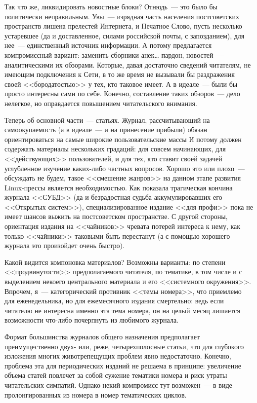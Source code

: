 Так что же, ликвидировать новостные блоки? Отнюдь~--- это было бы политически неправильным. Увы~--- изрядная часть населения постсоветских пространств лишена прелестей Интернета, и Печатное Слово, пусть несколько устаревшее (да и доставленное, силами российской почты, с запозданием), для нее~--- единственный источник информации. А потому предлагается компромиссный вариант: заменить сборники анек… пардон, новостей~--- аналитическими их обзорами. Которые, давая достаточно сведений читателям, не имеющим подключения к Сети, в то же время не вызывали бы раздражения своей <<бородатостью>> у тех, кто таковое имеет. А в идеале~--- были бы просто интересны сами по себе. Конечно, составление таких обзоров~--- дело нелегкое, но оправдается повышением читательского внимания.

Теперь об основной части~--- статьях. Журнал, рассчитывающий на самоокупаемость (а в идеале~--- и на принесение прибыли) обязан ориентироваться на самые широкие пользовательские массы И потому должен содержать материалы нескольких градаций: для совсем начинающих, для <<действующих>> пользователей, и для тех, кто ставит своей задачей углубленное изучение каких-либо частных вопросов. Хорошо это или плохо~--- обсуждать не будем, такое <<смешение жанров>> на данном этапе развития Linux-прессы является необходимостью. Как показала трагическая кончина журнала <<СУБД>> (да и безрадостная судьба аккумулировавших его <<Открытых систем>>), специализированное издание <<для профи>> пока не имеет шансов выжить на постсоветском пространстве. С другой стороны, ориентация издания на <<чайников>> чревата потерей интереса к нему, как только <<чайники>> таковыми быть перестанут (а с помощью хорошего журнала это произойдет очень быстро).

Какой видится компоновка материалов? Возможны варианты: по степени <<продвинутости>> предполагаемого читателя, по тематике, в том числе и с выделением некоего центрального материала и его <<системного окружения>>. Впрочем, я~--- категорический противник <<темы номера>>, что приемлемо для еженедельника, но для ежемесячного издания смертельно: ведь если читателю не интересна именно эта тема номера, он на целый месяц лишается возможности что-либо почерпнуть из любимого журнала.

Формат большинства журналов общего назначения предполагает преимущественно двух- или, реже, четырехполосные статьи, что для глубокого изложения многих животрепещущих проблем явно недостаточно. Конечно, проблема эта для периодических изданий не решаема в принципе: увеличение объема статей повлечет за собой сужение тематики номера и риск утраты читательских симпатий. Однако некий компромисс тут возможен~--- в виде пролонгированных из номера в номер тематических циклов.

